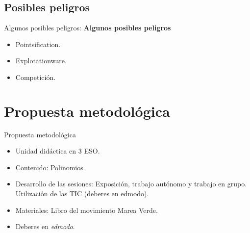 \documentclass[10pt,notes,compress,usetitleprogressbar,aspectratio=1610]{beamer}
\begin{document}
\subsection{Posibles peligros}
\begin{frame}{Algunos posibles peligros:}
\textbf{Algunos posibles peligros}
\begin{center}
\begin{itemize}
	\item Pointsification.
	\item Explotationware.
	\item Competición.
\end{itemize}
\end{center}
\end{frame}


\section{Propuesta metodológica}
\begin{frame}{Propuesta metodológica}
\begin{itemize}
	\item Unidad didáctica en 3 ESO.
	\item Contenido: Polinomios.
	\item Desarrollo de las sesiones: Exposición, trabajo autónomo y trabajo en grupo. Utilización de las TIC (deberes en edmodo).
	\item Materiales: Libro del movimiento Marea Verde.
	\item Deberes en \textit{edmodo}.
\end{itemize}
\end{frame}
 
\newcommand{\eaes}{Estándares de Aprendizaje Evaluables\xspace}
\end{document}
